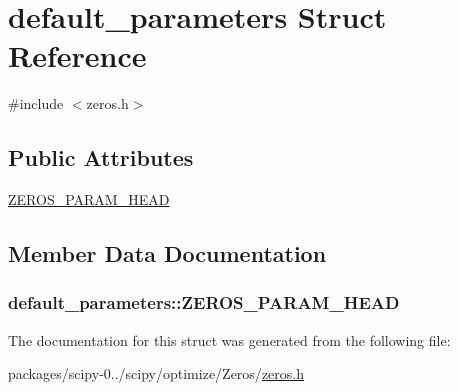 \hypertarget{structdefault__parameters}{}\section{default\+\_\+parameters Struct Reference}
\label{structdefault__parameters}


{\ttfamily \#include $<$zeros.\+h$>$}

\subsection*{Public Attributes}
\begin{DoxyCompactItemize}
\item 
\hyperlink{structdefault__parameters_a738fb64a7e910b4213b265473a181bf9}{Z\+E\+R\+O\+S\+\_\+\+P\+A\+R\+A\+M\+\_\+\+H\+E\+A\+D}
\end{DoxyCompactItemize}


\subsection{Member Data Documentation}
\hypertarget{structdefault__parameters_a738fb64a7e910b4213b265473a181bf9}{}
\subsubsection[{Z\+E\+R\+O\+S\+\_\+\+P\+A\+R\+A\+M\+\_\+\+H\+E\+A\+D}]{\setlength{\rightskip}{0pt plus 5cm}default\+\_\+parameters\+::\+Z\+E\+R\+O\+S\+\_\+\+P\+A\+R\+A\+M\+\_\+\+H\+E\+A\+D}\label{structdefault__parameters_a738fb64a7e910b4213b265473a181bf9}


The documentation for this struct was generated from the following file\+:\begin{DoxyCompactItemize}
\item 
packages/scipy-\/0../scipy/optimize/\+Zeros/\hyperlink{zeros_8h}{zeros.\+h}\end{DoxyCompactItemize}
